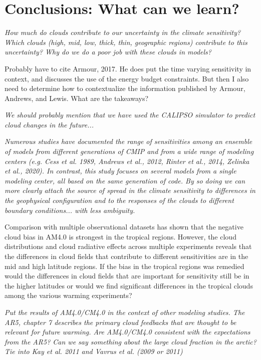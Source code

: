 \documentclass[draft]{agujournal2019}
\begin{document}
\section{Conclusions: What can we learn?}

\textit{How much do clouds contribute to our uncertainty in the climate sensitivity?  
Which clouds (high, mid, low, thick, thin, geographic regions) contribute to this uncertainty?
Why do we do a poor job with these clouds in models? }

Probably have to cite Armour, 2017.  He does put the time varying sensitivity in context, and discusses the use of the energy budget constraints.  But then I also need to determine how to contextualize the information published by Armour, Andrews, and Lewis.  What are the takeaways?  

\textit{We should probably mention that we have used the CALIPSO simulator to predict cloud changes in the future...}

\textit{Numerous studies have documented the range of sensitivities among an ensemble of models from different
generations of CMIP and from a wide range of modeling centers (e.g. Cess et al. 1989, Andrews et al., 2012, Rinter et al., 2014, Zelinka et al., 2020).  In contrast, this study focuses on several models from a single modeling center, all based on the same generation of code.  By so doing we can more clearly attach the source of spread in the climate sensitivity to differences in the geophysical configuration and to the responses of the clouds to different boundary conditions... with less ambiguity.}

Comparison with multiple observational datasets has shown that the negative cloud bias
in AM4.0 is strongest in the tropical regions.  However, the cloud distributions and 
cloud radiative effects across multiple experiments reveals that the differences in cloud fields that 
contribute to different sensitivities are in the mid and high latitude regions.  If the bias in 
the tropical regions was remedied would the differences in cloud fields that are important for sensitivity
still be in the higher latitudes or would we find significant differences in the tropical clouds among 
the various warming experiments?     

\textit{Put the results of AM4.0/CM4.0 in the context of other modeling studies.  The AR5, chapter 7 describes the primary 
cloud feedbacks that are thought to be relevant for future warming.  Are AM4.0/CM4.0 consistent with the expectations from the AR5?  Can we say something about the large cloud fraction in the arctic?  Tie into Kay et al. 2011 and Vavrus et al. (2009 or 2011)}
\end{document}
